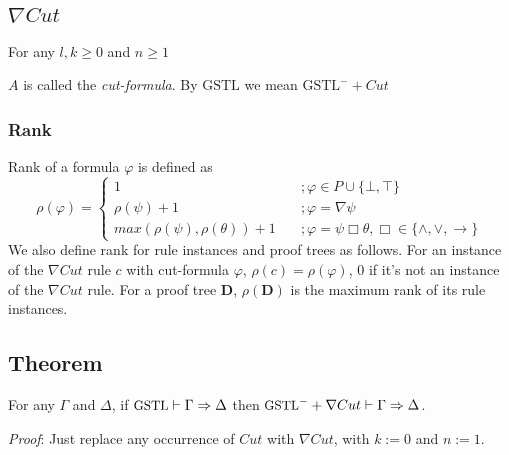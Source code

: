 \subsection{$\nabla Cut$} For any $l,k \ge 0$ and $n \ge 1$
\begin{prooftree}
\end{prooftree}
$A$ is called the \textit{cut-formula}.
By $\text{GSTL}$ we mean $\text{GSTL}^- + Cut$
\subsubsection{Rank} Rank of a formula $\varphi$ is defined as
\[ \rho(\varphi) = \begin{cases}
1 & \quad ; \varphi \in P \cup \{ \bot, \top \} \\
\rho(\psi) + 1 & \quad ; \varphi = \nabla \psi \\
max(\rho(\psi), \rho(\theta)) + 1 & \quad ; \varphi = \psi \Box \theta, \Box \in \{ \land , \lor, \rightarrow \}
\end{cases} \]
We also define rank for rule instances and proof trees as follows. For an instance of the $\nabla Cut$ rule $c$ with cut-formula $\varphi$, $\rho(c) = \rho(\varphi)$, $0$ if it's not an instance of the $\nabla Cut$ rule.
For a proof tree $\mathbf{D}$, $\rho(\mathbf{D})$ is the maximum rank of its rule instances.

\subsection{Theorem} For any $\Gamma$ and $\Delta$, if $\small\text{GSTL} \vdash \Gamma \Rightarrow \Delta$ then $\small\text{GSTL}^- + \nabla Cut \vdash \Gamma \Rightarrow \Delta$.

\textit{Proof}: Just replace any occurrence of $Cut$ with $\nabla Cut$, with $k := 0$ and $n := 1$.
